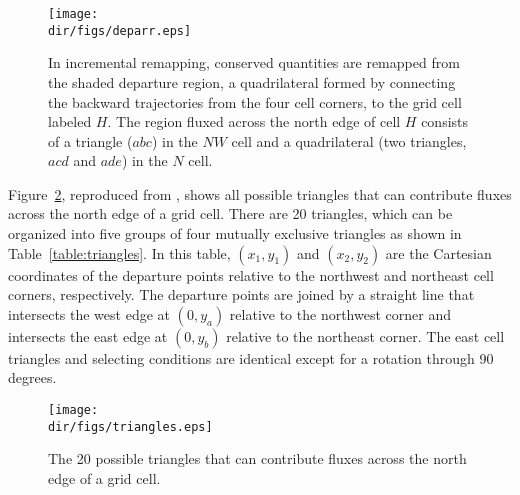\begin{figure}[htbp]
  \begin{center}
    \texttt{[image: \\dir/figs/deparr.eps]}
  \end{center}
  \caption{In incremental remapping, conserved
    quantities are remapped from the shaded departure region, a
    quadrilateral formed by connecting the backward trajectories
    from the four cell corners, to the grid cell labeled $H$.
    The region fluxed across the north edge of cell $H$ consists
    of a triangle ($abc$) in the $NW$ cell and a quadrilateral 
    (two triangles, $acd$ and $ade$) in the $N$ cell.}
  \label{fig:gliss.deparr}
\end{figure}

Figure~\ref{fig:gliss.triangles}, reproduced from \citet{Dukowicz2000}, shows all possible
triangles that can contribute fluxes across the north edge of a
grid cell.  There are 20 triangles, which can be organized into
five groups of four mutually exclusive triangles as shown in
Table~\ref{table:triangles}. In this table, $(x_1, y_1)$ and $(x_2,y_2)$ are the
Cartesian coordinates of the departure points relative to the
northwest and northeast cell corners, respectively.  The departure
points are joined by a straight line that intersects the west edge
at $(0,y_a)$ relative to the northwest corner and intersects the
east edge at $(0,y_b)$ relative to the northeast corner. The east cell
triangles and selecting conditions are identical except for a
rotation through 90 degrees.

\begin{figure}
  \label{fig:gliss.triangles}
  \centering
    \texttt{[image: \\dir/figs/triangles.eps]}
  \caption{The 20 possible triangles that can
    contribute fluxes across the north edge of a grid cell.}
\end{figure}


